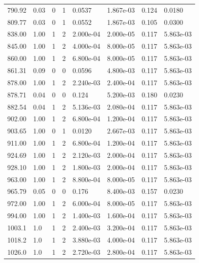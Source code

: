 \documentclass[preview]{standalone}
\begin{document}
{{{\begin{tabular}{L{1.2cm}C{1.2cm} C{0.3cm}C{0.5cm} C{1.4cm}C{1.4cm} C{1.4cm}C{1.4cm}}
  790.92  &  0.03  & 0     &  1 &  0.0537  & 1.867e-03  & 0.124 &  0.0180   \\ 
  809.77  &  0.03  & 0     &  1 &  0.0552  & 1.867e-03  & 0.105 &  0.0300   \\ 
  838.00  &  1.00  & 1     &  2 &  2.000e-04  & 2.000e-05  & 0.117 &  5.863e-03   \\ 
  845.00  &  1.00  & 1     &  2 &  4.000e-04  & 8.000e-05  & 0.117 &  5.863e-03   \\ 
  860.00  &  1.00  & 1     &  2 &  6.800e-04  & 8.000e-05  & 0.117 &  5.863e-03   \\ 
  861.31  &  0.09  & 0     &  0 &  0.0596  & 4.800e-03  & 0.117 &  5.863e-03   \\ 
  878.00  &  1.00  & 1     &  2 &  2.240e-03  & 2.400e-04  & 0.117 &  5.863e-03   \\ 
  878.71  &  0.04  & 0     &  0 &  0.124  & 5.200e-03  & 0.180 &  0.0230   \\ 
  882.54  &  0.04  & 1     &  2 &  5.136e-03  & 2.080e-04  & 0.117 &  5.863e-03   \\ 
  902.00  &  1.00  & 1     &  2 &  6.800e-04  & 1.200e-04  & 0.117 &  5.863e-03   \\ 
  903.65  &  1.00  & 0     &  1 &  0.0120  & 2.667e-03  & 0.117 &  5.863e-03   \\ 
  911.00  &  1.00  & 1     &  2 &  6.800e-04  & 1.200e-04  & 0.117 &  5.863e-03   \\ 
  924.69  &  1.00  & 1     &  2 &  2.120e-03  & 2.000e-04  & 0.117 &  5.863e-03   \\ 
  928.10  &  1.00  & 1     &  2 &  1.800e-03  & 2.000e-04  & 0.117 &  5.863e-03   \\ 
  963.00  &  1.00  & 1     &  2 &  8.800e-04  & 8.000e-05  & 0.117 &  5.863e-03   \\ 
  965.79  &  0.05  & 0     &  0 &  0.176  & 8.400e-03  & 0.157 &  0.0230   \\ 
  972.00  &  1.00  & 1     &  2 &  6.000e-04  & 8.000e-05  & 0.117 &  5.863e-03   \\ 
  994.00  &  1.00  & 1     &  2 &  1.400e-03  & 1.600e-04  & 0.117 &  5.863e-03   \\ 
  1003.1  &   1.0  & 1     &  2 &  2.400e-03  & 3.200e-04  & 0.117 &  5.863e-03   \\ 
  1018.2  &   1.0  & 1     &  2 &  3.880e-03  & 4.000e-04  & 0.117 &  5.863e-03   \\ 
  1026.0  &   1.0  & 1     &  2 &  2.720e-03  & 2.800e-04  & 0.117 &  5.863e-03   \\ 

\end{tabular}}}}
\end{document}
